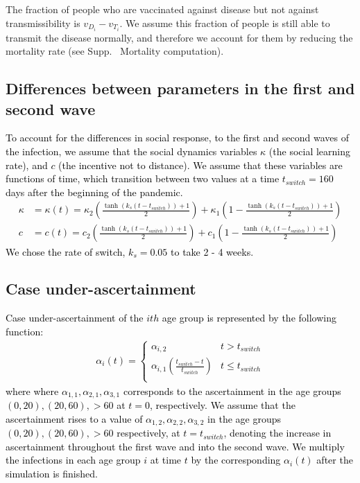 The fraction of people who are vaccinated against disease but not against transmissibility is $v_{D_i} - v_{T_i}$. We assume this fraction of people is still able to transmit the disease normally, and therefore we account for them by reducing the mortality rate (see Supp. ~Mortality computation). 


\subsection{Differences between parameters in the first and second wave}


 \textcolor{black}{To account for the differences in social response, to the first and second waves of the infection, we assume that the social dynamics variables $\kappa$ (the social learning rate), and $c$ (the incentive not to distance). We assume that these variables are functions of time, which transition between two values at a time $t_{switch} = 160$ days after the beginning of the pandemic.
\begin{align}
    \kappa &= \kappa(t) = \kappa_2 \left(\frac{\tanh\left(k_s(t - t_{switch})\right) + 1}{2}\right) +  \kappa_1 \left(1 - \frac{\tanh\left(k_s(t - t_{switch})\right) + 1}{2}\right)\\
    c &= c(t) = c_2 \left(\frac{\tanh\left(k_s(t - t_{switch})\right) + 1}{2}\right) + c_1 \left(1 - \frac{\tanh\left(k_s(t - t_{switch})\right) + 1}{2}\right)
    \label{second_wave}
\end{align}
We chose the rate of switch, $k_s= 0.05$ to take 2 - 4 weeks.}

\subsection{Case under-ascertainment} 
\label{ascertainment}

 \textcolor{black}{
Case under-ascertainment of the $ith$ age group is represented by the following function:
\begin{eqnarray}
\alpha_i(t) = \left\{
  \begin{array}{ll}
          \alpha_{i,2} & t >t_{switch}\\ 
          \alpha_{i,1}\left(\frac{t_{switch} - t}{t_{switch}}\right) & t \leq t_{switch}\\
    \end{array} 
 \right.
 \label{ascertainment_eqn}
\end{eqnarray}
where where $\alpha_{1,1}, \alpha_{2,1}, \alpha_{3,1}$ corresponds to the ascertainment in the age groups $(0,20),(20,60),> 60$ at $t = 0$, respectively. We assume that the ascertainment rises to a value of $\alpha_{1,2}, \alpha_{2,2}, \alpha_{3,2}$ in the age groups $(0,20),(20,60),> 60$ respectively, at $t = t_{switch}$, denoting the increase in ascertainment throughout the first wave and into the second wave. We multiply the infections in each age group $i$ at time $t$ by the corresponding $\alpha_i(t)$ after the simulation is finished.}

